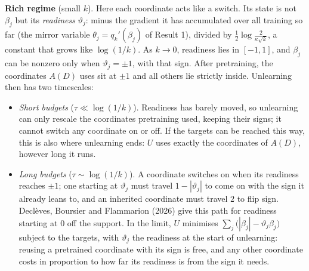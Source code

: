 \documentclass[10pt]{article}
\begin{document}
\textbf{Rich regime} (small $k$). Here each coordinate acts like a switch. Its state is not $\beta_j$ but its \emph{readiness} $\vartheta_j$: minus the gradient it has accumulated over all training so far (the mirror variable $\theta_j=q_k'(\beta_j)$ of Result 1), divided by $\frac12\log\frac{2}{\kappa\sqrt k}$, a constant that grows like $\log(1/k)$. As $k\to0$, readiness lies in $[-1,1]$, and $\beta_j$ can be nonzero only when $\vartheta_j=\pm1$, with that sign. After pretraining, the coordinates $A(D)$ uses sit at $\pm1$ and all others lie strictly inside. Unlearning then has two timescales:
\begin{itemize}\itemsep1pt
\item \emph{Short budgets} ($\tau\ll\log(1/k)$). Readiness has barely moved, so unlearning can only rescale the coordinates pretraining used, keeping their signs; it cannot switch any coordinate on or off. If the targets can be reached this way, this is also where unlearning ends: $U$ uses exactly the coordinates of $A(D)$, however long it runs.
\item \emph{Long budgets} ($\tau\sim\log(1/k)$). A coordinate switches on when its readiness reaches $\pm1$; one starting at $\vartheta_j$ must travel $1-|\vartheta_j|$ to come on with the sign it already leans to, and an inherited coordinate must travel $2$ to flip sign. Declèves, Boursier and Flammarion (2026) give this path for readiness starting at $0$ off the support. In the limit, $U$ minimises $\sum_j\big(|\beta_j|-\vartheta_j\beta_j\big)$ subject to the targets, with $\vartheta_j$ the readiness at the start of unlearning: reusing a pretrained coordinate with its sign is free, and any other coordinate costs in proportion to how far its readiness is from the sign it needs.
\end{itemize}
\end{document}
